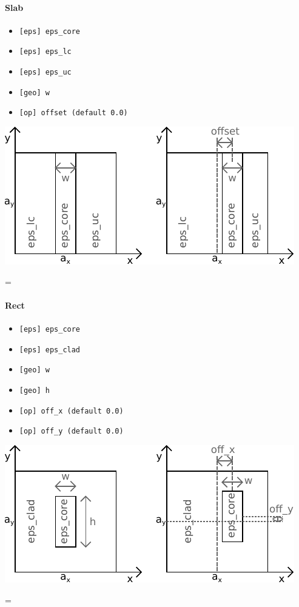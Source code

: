 \documentclass[a4paper,10pt]{report}
\newenvironment{absolutelynopagebreak}
  {\par\nobreak\vfil\penalty0\vfilneg
   \vtop\bgroup}
  {\par\xdef\tpd{\the\prevdepth}\egroup
   \prevdepth=\tpd}
\begin{document}
\begin{absolutelynopagebreak}
\paragraph{Slab}
\begin{itemize}[noitemsep,topsep=0pt,parsep=0pt,partopsep=0pt]
\item \texttt{[eps] eps\_core}
\item \texttt{[eps] eps\_lc}
\item \texttt{[eps] eps\_uc}
\item \texttt{[geo] w}
\item \texttt{[op] offset (default 0.0)} 
\end{itemize}
\includegraphics[width=\textwidth]{figures/cr_slab.pdf}
\end{absolutelynopagebreak}

\begin{absolutelynopagebreak}
\paragraph{Rect}
\begin{itemize}[noitemsep,topsep=0pt,parsep=0pt,partopsep=0pt]
\item \texttt{[eps] eps\_core}
\item \texttt{[eps] eps\_clad}
\item \texttt{[geo] w}
\item \texttt{[geo] h}
\item \texttt{[op] off\_x (default 0.0)} 
\item \texttt{[op] off\_y (default 0.0)} 
\end{itemize}
\includegraphics[width=\textwidth]{figures/cr_rect.pdf}
\end{absolutelynopagebreak}
\end{document}
